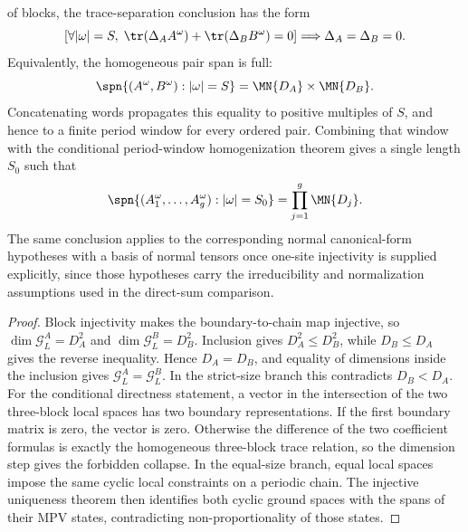 \begin{lemma}
    of blocks, the trace-separation conclusion has the form
    \[
        \left[
        \forall |\omega|=S,\;
        \tr(\Delta_A A^\omega)+\tr(\Delta_B B^\omega)=0
        \right]
        \Longrightarrow
        \Delta_A=\Delta_B=0.
    \]
    Equivalently, the homogeneous pair span is full:
    \[
        \spn\{(A^\omega,B^\omega):|\omega|=S\}
        =
        \MN{D_A}\times\MN{D_B}.
    \]
    Concatenating words propagates this equality to positive multiples of
    \(S\), and hence to a finite period window for every ordered pair. Combining
    that window with the conditional period-window homogenization theorem gives
    a single length \(S_0\) such that
    \[
        \spn\{(A_1^\omega,\ldots,A_g^\omega):|\omega|=S_0\}
        =
        \prod_{j=1}^g \MN{D_j}.
    \]
    The same conclusion applies to the corresponding normal canonical-form
    hypotheses with a basis of normal tensors once one-site injectivity is
    supplied explicitly, since those hypotheses carry the irreducibility and
    normalization assumptions used in the direct-sum comparison.
\end{lemma}

\begin{proof}\leanok
    Block injectivity makes the boundary-to-chain map injective, so
    $\dim\mathcal G_L^A=D_A^2$ and $\dim\mathcal G_L^B=D_B^2$.
    Inclusion gives $D_A^2\le D_B^2$, while $D_B\le D_A$ gives the
    reverse inequality. Hence $D_A=D_B$, and equality of dimensions inside
    the inclusion gives \(\mathcal G_L^A=\mathcal G_L^B\). In the strict-size
    branch this contradicts $D_B<D_A$. For the conditional directness
    statement, a vector in the intersection of the two three-block local spaces
    has two boundary representations. If the first boundary matrix is zero,
    the vector is zero. Otherwise the difference of the two coefficient
    formulas is exactly the homogeneous three-block trace relation, so the
    dimension step gives the forbidden collapse. In the equal-size branch,
    equal local spaces impose the same cyclic local constraints on a
    periodic chain. The injective uniqueness theorem then identifies both
    cyclic ground spaces with the spans of their MPV states, contradicting
    non-proportionality of those states.
\end{proof}

